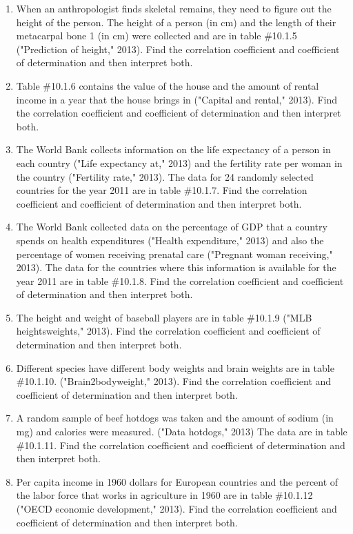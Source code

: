 \documentclass[]{book}
\begin{document}
\begin{enumerate}
\def\labelenumi{\arabic{enumi}.}
\item
  When an anthropologist finds skeletal remains, they need to figure out the height of the person. The height of a person (in cm) and the length of their metacarpal bone 1 (in cm) were collected and are in table \#10.1.5 ("Prediction of height," 2013). Find the correlation coefficient and coefficient of determination and then interpret both.
\item
  Table \#10.1.6 contains the value of the house and the amount of rental income in a year that the house brings in ("Capital and rental," 2013). Find the correlation coefficient and coefficient of determination and then interpret both.
\item
  The World Bank collects information on the life expectancy of a person in each country ("Life expectancy at," 2013) and the fertility rate per woman in the country ("Fertility rate," 2013). The data for 24 randomly selected countries for the year 2011 are in table \#10.1.7. Find the correlation coefficient and coefficient of determination and then interpret both.
\item
  The World Bank collected data on the percentage of GDP that a country spends on health expenditures ("Health expenditure," 2013) and also the percentage of women receiving prenatal care ("Pregnant woman receiving," 2013). The data for the countries where this information is available for the year 2011 are in table \#10.1.8. Find the correlation coefficient and coefficient of determination and then interpret both.
\item
  The height and weight of baseball players are in table \#10.1.9 ("MLB heightsweights," 2013). Find the correlation coefficient and coefficient of determination and then interpret both.
\item
  Different species have different body weights and brain weights are in table \#10.1.10. ("Brain2bodyweight," 2013). Find the correlation coefficient and coefficient of determination and then interpret both.
\item
  A random sample of beef hotdogs was taken and the amount of sodium (in mg) and calories were measured. ("Data hotdogs," 2013) The data are in table \#10.1.11. Find the correlation coefficient and coefficient of determination and then interpret both.
\item
  Per capita income in 1960 dollars for European countries and the percent of the labor force that works in agriculture in 1960 are in table \#10.1.12 ("OECD economic development," 2013). Find the correlation coefficient and coefficient of determination and then interpret both.

\end{enumerate}
\end{document}
